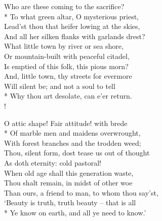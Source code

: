 Who are these coming to the sacrifice?\\*
\vin To what green altar, O mysterious priest,\\
Lead'st thou that heifer lowing at the skies,\\
\vin And all her silken flanks with garlands drest?\\
What little town by river or sea shore,\\
\vin Or mountain-built with peaceful citadel,\\
\vin \vin Is emptied of this folk, this pious morn?\\
And, little town, thy streets for evermore\\
\vin Will silent be; and not a soul to tell\\*
\vin \vin Why thou art desolate, can e'er return.\\!

O attic shape! Fair attitude! with brede\\*
\vin Of marble men and maidens overwrought,\\
With forest branches and the trodden weed;\\
\vin Thou, silent form, dost tease us out of thought\\
As doth eternity: cold pastoral!\\
\vin When old age shall this generation waste,\\
\vin \vin Thou shalt remain, in midst of other woe\\
Than ours, a friend to man, to whom thou say'st,\\
\vin `Beauty is truth, truth beauty -- that is all\\*
\vin \vin Ye know on earth, and all ye need to know.'